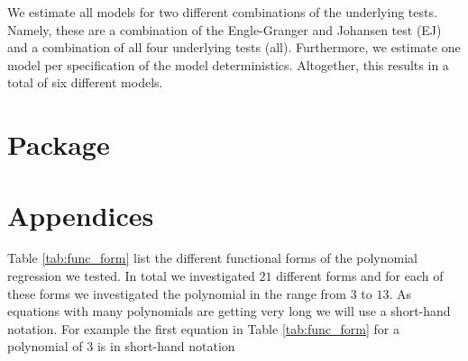 \documentclass[12pt,a4paper]{article}
\begin{document}
We estimate all models for two different combinations of the underlying
tests. Namely, these are a combination of the Engle-Granger and Johansen
test (EJ) and a combination of all four underlying tests (all).
Furthermore, we estimate one model per specification of the model
deterministics. Altogether, this results in a total of six different
models.

\hypertarget{package}{%
\section{Package}\label{package}}

\pagebreak

\setcounter{page}{3}
\printbibliography[title = References]
\cleardoublepage

\begin{refsection}
\nocite{R-base}
\nocite{R-stargazer}
\nocite{R-stringr}
\nocite{R-tidyr}
\nocite{R-dplyr}
\nocite{R-glmnet}
\nocite{R-class}
\nocite{R-MASS}
\nocite{R-plm}
\nocite{R-leaps}
\nocite{R-caret}
\nocite{R-tree}
\nocite{R-gbm}
\nocite{R-plotmo}
\nocite{R-pls}
\nocite{R-splines}
\nocite{R-tictoc}
\nocite{R-plotly}
\nocite{R-inspectdf}
\nocite{R-rpart}
\nocite{R-rpart.plot}
\nocite{R-stargazer}
\nocite{R-knitr}
\nocite{R-purrr}
\nocite{R-randomForest}
\nocite{R-rstudioapi}





\nocite{R-Studio}

\printbibliography[title = Software-References]
\end{refsection}

\cleardoublepage
\appendix
\setcounter{table}{0}
\setcounter{figure}{0}
\renewcommand{\thetable}{A\arabic{table}}
\renewcommand{\thefigure}{A\arabic{figure}}


\hypertarget{appendices}{%
\section{Appendices}\label{appendices}}

Table \ref{tab:func_form} list the different functional forms of the
polynomial regression we tested. In total we investigated \(21\)
different forms and for each of these forms we investigated the
polynomial in the range from \(3\) to \(13\). As equations with many
polynomials are getting very long we will use a short-hand notation. For
example the first equation in Table \ref{tab:func_form} for a polynomial
of \(3\) is in short-hand notation
\end{document}
